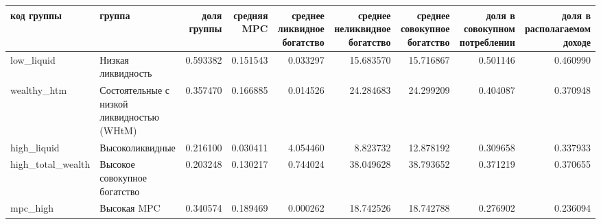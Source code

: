 \begin{tabular}{llrrrrrrr}
\toprule
код группы & группа & доля группы & средняя MPC & среднее ликвидное богатство & среднее неликвидное богатство & среднее совокупное богатство & доля в совокупном потреблении & доля в располагаемом доходе \\
\midrule
low_liquid & Низкая ликвидность & 0.593382 & 0.151543 & 0.033297 & 15.683570 & 15.716867 & 0.501146 & 0.460990 \\
wealthy_htm & Состоятельные с низкой ликвидностью (WHtM) & 0.357470 & 0.166885 & 0.014526 & 24.284683 & 24.299209 & 0.404087 & 0.370948 \\
high_liquid & Высоколиквидные & 0.216100 & 0.030411 & 4.054460 & 8.823732 & 12.878192 & 0.309658 & 0.337933 \\
high_total_wealth & Высокое совокупное богатство & 0.203248 & 0.130217 & 0.744024 & 38.049628 & 38.793652 & 0.371219 & 0.370655 \\
mpc_high & Высокая MPC & 0.340574 & 0.189469 & 0.000262 & 18.742526 & 18.742788 & 0.276902 & 0.236094 \\
\bottomrule
\end{tabular}
